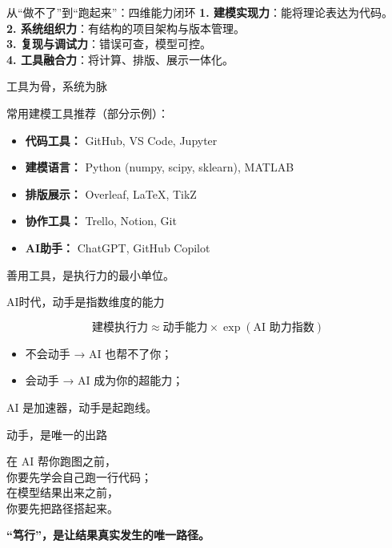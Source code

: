 \begin{frame}{\color{steelwhite}从“做不了”到“跑起来”：四维能力闭环}
\justifying
{\color{textblack}
\textbf{1. 建模实现力}：能将理论表达为代码。\\
\textbf{2. 系统组织力}：有结构的项目架构与版本管理。\\
\textbf{3. 复现与调试力}：错误可查，模型可控。\\
\textbf{4. 工具融合力}：将计算、排版、展示一体化。
}
\end{frame}

\begin{frame}{\color{steelwhite}工具为骨，系统为脉}
\justifying
{\color{textblack}
常用建模工具推荐（部分示例）：

\begin{itemize}
  \item \textbf{代码工具：} GitHub, VS Code, Jupyter
  \item \textbf{建模语言：} Python (numpy, scipy, sklearn), MATLAB
  \item \textbf{排版展示：} Overleaf, LaTeX, TikZ
  \item \textbf{协作工具：} Trello, Notion, Git
  \item \textbf{AI助手：} ChatGPT, GitHub Copilot
\end{itemize}

\vspace{0.5em}
\centering
善用工具，是执行力的最小单位。
}
\end{frame}

\begin{frame}{\color{steelwhite}AI时代，动手是指数维度的能力}
\justifying
{\color{textblack}
\[
\text{建模执行力} \approx \text{动手能力} \times \exp(\text{AI 助力指数})
\]

\vspace{0.5em}
\begin{itemize}
  \item 不会动手 → AI 也帮不了你；
  \item 会动手 → AI 成为你的超能力；
\end{itemize}

\vspace{0.5em}
AI 是加速器，动手是起跑线。
}
\end{frame}

\begin{frame}{\color{steelwhite}动手，是唯一的出路}
\justifying
{\color{textblack}
在 AI 帮你跑图之前，\\
你要先学会自己跑一行代码；\\
在模型结果出来之前，\\
你要先把路径搭起来。

\vspace{1em}
\centering
\textbf{\color{steelwhite}“笃行”，是让结果真实发生的唯一路径。}
}
\end{frame}
